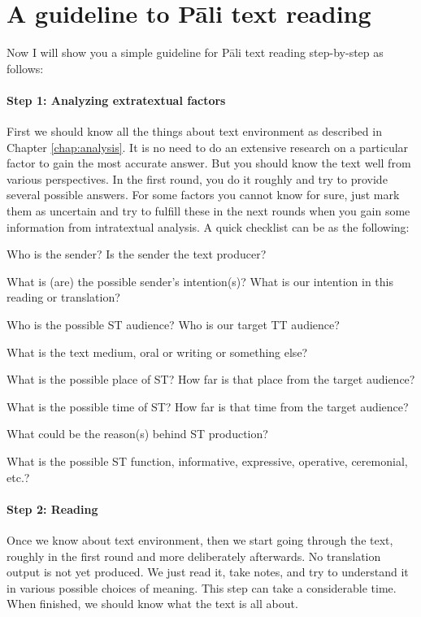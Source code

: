 {}
\section*{A guideline to P\=ali text reading}

Now I will show you a simple guideline for P\=ali text reading step-by-step as follows:

\paragraph*{Step 1: Analyzing extratextual factors} First we should know all the things about text environment as described in Chapter \ref{chap:analysis}. It is no need to do an extensive research on a particular factor to gain the most accurate answer. But you should know the text well from various perspectives. In the first round, you do it roughly and try to provide several possible answers. For some factors you cannot know for sure, just mark them as uncertain and try to fulfill these in the next rounds when you gain some information from intratextual analysis. A quick checklist can be as the following:

\begin{compactenum}[(1)]
\item Who is the sender? Is the sender the text producer?
\item What is (are) the possible sender's intention(s)? What is our intention in this reading or translation?
\item Who is the possible ST audience? Who is our target TT audience?
\item What is the text medium, oral or writing or something else?
\item What is the possible place of ST? How far is that place from the target audience?
\item What is the possible time of ST? How far is that time from the target audience?
\item What could be the reason(s) behind ST production?
\item What is the possible ST function, informative, expressive, operative, ceremonial, etc.?
\end{compactenum}

\paragraph*{Step 2: Reading} Once we know about text environment, then we start going through the text, roughly in the first round and more deliberately afterwards. No translation output is not yet produced. We just read it, take notes, and try to understand it in various possible choices of meaning. This step can take a considerable time. When finished, we should know what the text is all about.

